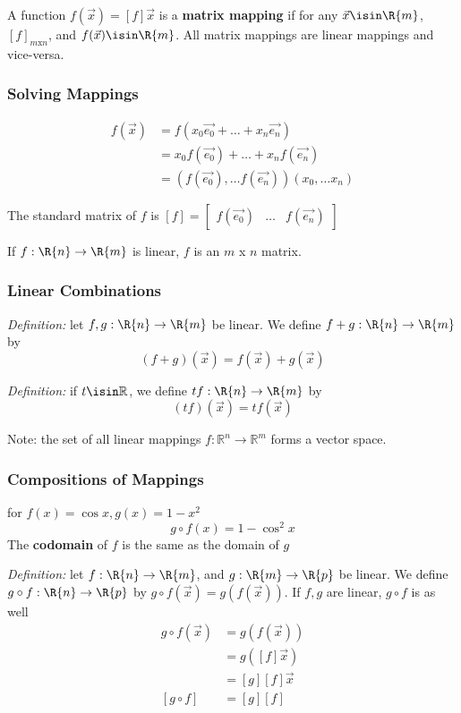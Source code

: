 \documentclass[12pt]{article}
\begin{document}
A function $f(\vec{x}) = [f]\vec{x}$ is a {\bf matrix mapping} if for any $\vec{x}\isin\R{m}$, $[f]_{m\text{x}n}$, and $f(\vec{x})\isin\R{m}$. All matrix mappings are linear mappings and vice-versa.

\subsubsection*{Solving Mappings}
\begin{align*}
f(\vec{x}) &= f(x_0\vec{e_0} + \dots + x_n\vec{e_n})\\
&= x_0f(\vec{e_0}) + \dots + x_nf(\vec{e_n})\\
&= (f(\vec{e_0}),\dots f(\vec{e_n}))(x_0,\dots x_n)
\end{align*}

The standard matrix of $f$ is $[f] = \begin{bmatrix}f(\vec{e_0})&\dots&f(\vec{e_n})\end{bmatrix}$

If $f: \R{n} \to \R{m}$ is linear, $f$ is an $m$ x $n$ matrix.

\subsubsection*{Linear Combinations}
\textit{Definition:} let $f, g: \R{n} \to \R{m}$ be linear. We define $f + g : \R{n} \to \R{m}$ by \[ (f + g)(\vec{x}) = f(\vec{x}) + g(\vec{x}) \]

\textit{Definition:} if $t\isin\mathbb{R}$, we define $tf: \R{n} \to \R{m}$ by \[ (tf)(\vec{x}) = tf(\vec{x}) \]

Note: the set of all linear mappings $f: \mathbb{R}^n \rightarrow \mathbb{R}^m$ forms a vector space.

\subsubsection*{Compositions of Mappings}
for $f(x) = \cos x, g(x) = 1 - x^2$ \[ g \circ f(x) = 1 - \cos^2 x \] The {\bf codomain} of $f$ is the same as the domain of $g$

\textit{Definition:} let $f : \R{n} \to \R{m}$, and $g : \R{m} \to \R{p}$ be linear. We define $g\circ f : \R{n} \to \R{p}$ by $g\circ f(\vec{x}) = g(f(\vec{x}))$. If $f,g$ are linear, $g\circ f$ is as well
\begin{align*}
g\circ f(\vec{x}) &= g(f(\vec{x}))\\
&= g([f]\vec{x})\\
&= [g][f]\vec{x}\\
[g\circ f] &= [g][f]
\end{align*}
\end{document}
